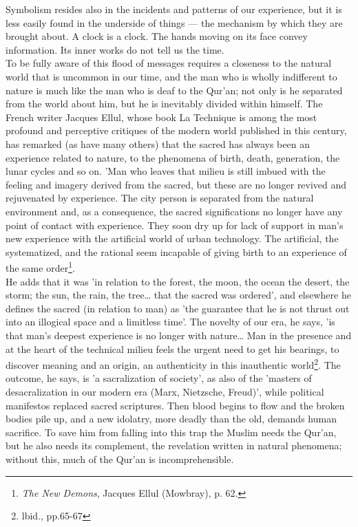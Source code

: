 \documentclass[11pt, b5paper, twoside]{book}
\begin{document}
Symbolism resides also in the incidents and patterns of our experience, but it is less easily found 
in the underside of things --- the mechanism by which they are brought about. A clock is a clock. The 
hands moving on its face convey information. Its inner works do not tell us the time. \\

To be fully aware of this flood of messages requires a closeness to the natural world that is 
uncommon in our time, and the man who is wholly indifferent to nature is much like the man who is 
deaf to the Qur'an; not only is he separated from the world about him, but he is inevitably divided 
within himself. The French writer Jacques Ellul, whose book La Technique is among the most profound 
and perceptive critiques of the modern world published in this century, has remarked (as have many 
others) that the sacred has always been an experience related to nature, to the phenomena of birth, 
death, generation, the lunar cycles and so on. 'Man who leaves that milieu is still imbued with the 
feeling and imagery derived from the sacred, but these are no longer revived and rejuvenated by 
experience. The city person is separated from the natural environment and, as a consequence, the 
sacred significations no longer have any point of contact with experience. They soon dry up for lack 
of support in man's new experience with the artificial world of urban technology. The artificial, the 
systematized, and the rational seem incapable of giving birth to an experience of the same 
order\footnote{\emph{The New Demons}, Jacques Ellul (Mowbray), p. 62.}.\\

He adds that it was 'in relation to the forest, the moon, the ocean the desert, the storm; the sun, 
the rain, the tree\ldots{} that the sacred was ordered', and elsewhere he defines the sacred (in relation 
to man) as 'the guarantee that he is not thrust out into an illogical space and a limitless time'. 
The novelty of our era, he says, 'is that man's deepest experience is no longer with nature\ldots{} Man in 
the presence and at the heart of the technical milieu feels the urgent need to get his bearings, to 
discover meaning and an origin, an authenticity in this inauthentic world\footnote{lbid., pp.65-67}. The outcome, he says, is 'a sacralization of society', as also of the 'masters of desacralization in our modern era (Marx, Nietzsche, Freud)', while political manifestos replaced sacred scriptures. Then blood begins to flow and the broken bodies pile up, and a new idolatry, more deadly than the old, demands human sacrifice. To save him from falling into this trap the Muslim needs the Qur'an, but he also needs its 
complement, the revelation written in natural phenomena; without this, much of the Qur'an is 
incomprehensible. \\
\end{document}
